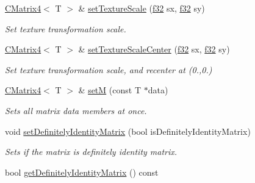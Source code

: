 \begin{DoxyCompactItemize}
\hyperlink{classirr_1_1core_1_1CMatrix4}{C\+Matrix4}$<$ T $>$ \& \hyperlink{classirr_1_1core_1_1CMatrix4_aa42d504d84e1d43b0a6563914c8dbc67}{set\+Texture\+Scale} (\hyperlink{namespaceirr_a0277be98d67dc26ff93b1a6a1d086b07}{f32} sx, \hyperlink{namespaceirr_a0277be98d67dc26ff93b1a6a1d086b07}{f32} sy)
\begin{DoxyCompactList}\small\item\em Set texture transformation scale. \end{DoxyCompactList}\item 
\hyperlink{classirr_1_1core_1_1CMatrix4}{C\+Matrix4}$<$ T $>$ \& \hyperlink{classirr_1_1core_1_1CMatrix4_a0d0eb1cc11d366bf82055f3586c6d80a}{set\+Texture\+Scale\+Center} (\hyperlink{namespaceirr_a0277be98d67dc26ff93b1a6a1d086b07}{f32} sx, \hyperlink{namespaceirr_a0277be98d67dc26ff93b1a6a1d086b07}{f32} sy)
\begin{DoxyCompactList}\small\item\em Set texture transformation scale, and recenter at (0.,0.) \end{DoxyCompactList}\item 
\mbox{\label{classirr_1_1core_1_1CMatrix4_a865190db115ea93d527c82bbc1606952}} 
\hyperlink{classirr_1_1core_1_1CMatrix4}{C\+Matrix4}$<$ T $>$ \& \hyperlink{classirr_1_1core_1_1CMatrix4_a865190db115ea93d527c82bbc1606952}{setM} (const T $\ast$data)
\begin{DoxyCompactList}\small\item\em Sets all matrix data members at once. \end{DoxyCompactList}\item 
\mbox{\label{classirr_1_1core_1_1CMatrix4_a87f7195337a2bf7a49978c2ec1100c0a}} 
void \hyperlink{classirr_1_1core_1_1CMatrix4_a87f7195337a2bf7a49978c2ec1100c0a}{set\+Definitely\+Identity\+Matrix} (bool is\+Definitely\+Identity\+Matrix)
\begin{DoxyCompactList}\small\item\em Sets if the matrix is definitely identity matrix. \end{DoxyCompactList}\item 
\mbox{\label{classirr_1_1core_1_1CMatrix4_af71afd95d942162c1ba5f38b01396dd3}} 
bool \hyperlink{classirr_1_1core_1_1CMatrix4_af71afd95d942162c1ba5f38b01396dd3}{get\+Definitely\+Identity\+Matrix} () const

\end{DoxyCompactItemize}
